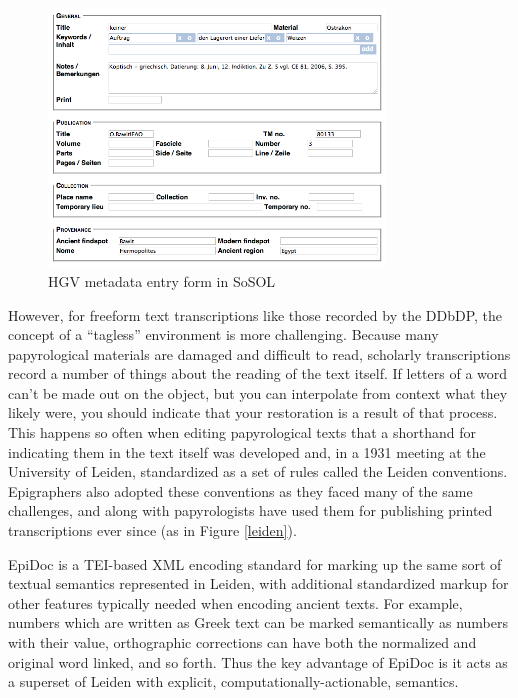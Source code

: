 \documentclass[]{article}
\begin{document}
\begin{figure}[!h]
  \centering
  \includegraphics[width=0.8\textwidth]{images/hgvmeta.png}
  \caption{HGV metadata entry form in SoSOL\label{hgvmeta}}
\end{figure}

However, for freeform text transcriptions like those recorded by the DDbDP, the concept of a “tagless” environment is more challenging. Because many papyrological materials are damaged and difficult to read, scholarly transcriptions record a number of things about the reading of the text itself. If letters of a word can't be made out on the object, but you can interpolate from context what they likely were, you should indicate that your restoration is a result of that process. This happens so often when editing papyrological texts that a shorthand for indicating them in the text itself was developed  and, in a 1931 meeting at the University of Leiden, standardized as a set of rules called the Leiden conventions. Epigraphers also adopted these conventions as they faced many of the same challenges, and along with papyrologists have used them for publishing printed transcriptions ever since (as in Figure \ref{leiden}).

EpiDoc is a TEI-based XML encoding standard for marking up the same sort of textual semantics represented in Leiden, with additional standardized markup for other features typically needed when encoding ancient texts. For example, numbers which are written as Greek text can be marked semantically as numbers with their value, orthographic corrections can have both the normalized and original word linked, and so forth. Thus the key advantage of EpiDoc is it acts as a superset of Leiden with explicit, computationally-actionable, semantics.
\end{document}
